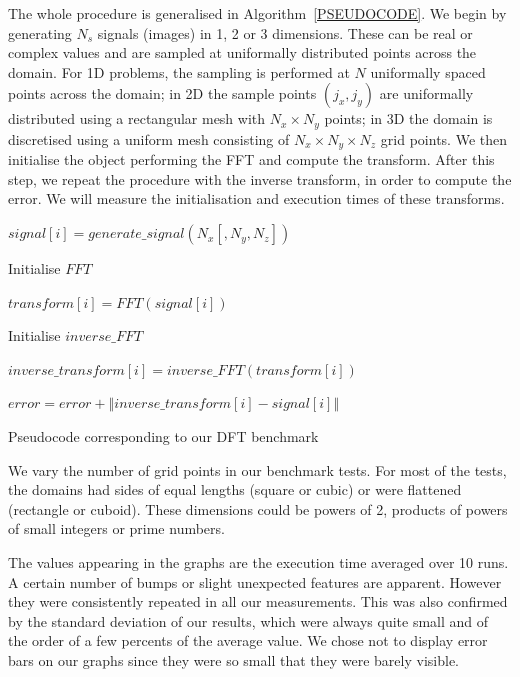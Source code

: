 \documentclass[12pt, a4paper]{article} \setlength{\textheight}{24cm}
\begin{document}
The whole procedure is generalised in Algorithm~\ref{PSEUDOCODE}. We
begin by generating $N_s$ signals (images) in 1, 2 or 3 dimensions.
These can be real or complex values and are sampled at uniformally
distributed points across the domain. For 1D problems, the sampling is
performed at $N$ uniformally spaced points across the domain; in 2D
the sample points $(j_x,j_y)$ are uniformally distributed using a
rectangular mesh with $N_x\times N_y$ points; in 3D the domain is
discretised using a uniform mesh consisting of $N_x\times N_y\times
N_z$ grid points. We then initialise the object performing the FFT and
compute the transform. After this step, we repeat the procedure with
the inverse transform, in order to compute the error. We will measure
the initialisation and execution times of these transforms.
\begin{algorithm}[H]
  \centering
  \begin{algorithmic}
     \STATE
    $signal[i]=generate\_signal(N_x [,N_y, N_z])$
    \ENDFOR

    \STATE Initialise $FFT$

     \STATE $transform[i]=FFT(signal[i])$
    \ENDFOR

    \STATE Initialise $inverse\_FFT$

     \STATE
    $inverse\_transform[i]=inverse\_FFT(transform[i])$
    \ENDFOR

     \STATE $error=error+\left\Vert
      inverse\_transform[i]-signal[i]\right\Vert$
    \ENDFOR
  \end{algorithmic}
  \caption{Pseudocode corresponding to our DFT benchmark}
  \label{PSEUDOCODE}
\end{algorithm}

We vary the number of grid points in our benchmark tests. For most of
the tests, the domains had sides of equal lengths (square or cubic) or
were flattened (rectangle or cuboid). These dimensions could be powers
of 2, products of powers of small integers or prime numbers.

The values appearing in the graphs are the execution time averaged
over 10 runs. A certain number of bumps or slight unexpected features
are apparent. However they were consistently repeated in all our
measurements. This was also confirmed by the standard deviation of our
results, which were always quite small and of the order of a few
percents of the average value. We chose not to display error bars on
our graphs since they were so small that they were barely visible.
\end{document}
